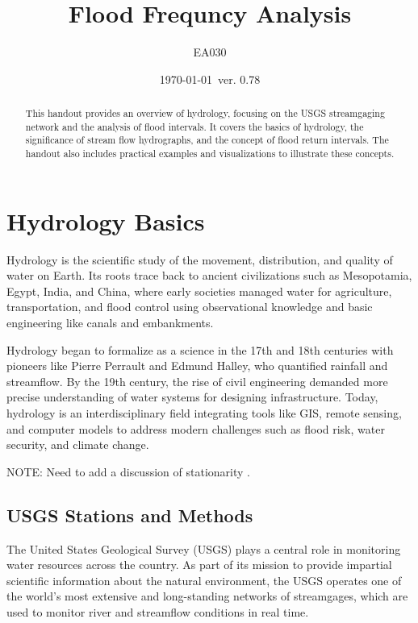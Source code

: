 \documentclass{tufte-handout}\usepackage[]{graphicx}\usepackage[]{xcolor}
\title{Flood Frequncy Analysis}
\author{EA030}
\date{\today~ver. 0.78}
\begin{document}
\maketitle%
\begin{abstract}
\noindent 
This handout provides an overview of hydrology, focusing on the USGS streamgaging network and the analysis of flood intervals. It covers the basics of hydrology, the significance of stream flow hydrographs, and the concept of flood return intervals. The handout also includes practical examples and visualizations to illustrate these concepts.
\end{abstract}



\section{Hydrology Basics}

Hydrology is the scientific study of the movement, distribution, and quality of water on Earth. Its roots trace back to ancient civilizations such as Mesopotamia, Egypt, India, and China, where early societies managed water for agriculture, transportation, and flood control using observational knowledge and basic engineering like canals and embankments.

Hydrology began to formalize as a science in the 17th and 18th centuries with pioneers like Pierre Perrault and Edmund Halley, who quantified rainfall and streamflow. By the 19th century, the rise of civil engineering demanded more precise understanding of water systems for designing infrastructure. Today, hydrology is an interdisciplinary field integrating tools like GIS, remote sensing, and computer models to address modern challenges such as flood risk, water security, and climate change.

NOTE: Need to add a discussion of stationarity \citep{merz2021causes,shao2024research, pielke2009collateral}.

\subsection{USGS Stations and Methods}

The United States Geological Survey (USGS) plays a central role in monitoring water resources across the country. As part of its mission to provide impartial scientific information about the natural environment, the USGS operates one of the world’s most extensive and long-standing networks of streamgages, which are used to monitor river and streamflow conditions in real time.
\end{document}
